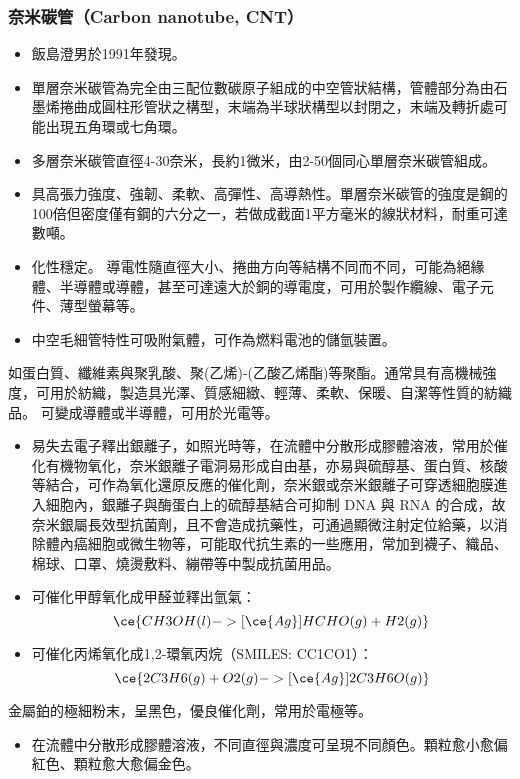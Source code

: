 \documentclass[a4paper,12pt]{report}
\begin{document}
\begin{itemize}
\begin{itemize}
\begin{itemize}
\subsubsection{奈米碳管（Carbon nanotube, CNT）}
\begin{itemize}
\item 飯島澄男於1991年發現。
\item 單層奈米碳管為完全由三配位數碳原子組成的中空管狀結構，管體部分為由石墨烯捲曲成圓柱形管狀之構型，末端為半球狀構型以封閉之，末端及轉折處可能出現五角環或七角環。
\item 多層奈米碳管直徑4-30奈米，長約1微米，由2-50個同心單層奈米碳管組成。
\item 具高張力強度、強韌、柔軟、高彈性、高導熱性。單層奈米碳管的強度是鋼的100倍但密度僅有鋼的六分之一，若做成截面1平方毫米的線狀材料，耐重可達數噸。
\item 化性穩定。
導電性隨直徑大小、捲曲方向等結構不同而不同，可能為絕緣體、半導體或導體，甚至可達遠大於銅的導電度，可用於製作纜線、電子元件、薄型螢幕等。
\item 中空毛細管特性可吸附氣體，可作為燃料電池的儲氫裝置。
\end{itemize}
如蛋白質、纖維素與聚乳酸、聚(乙烯)-(乙酸乙烯酯)等聚酯。通常具有高機械強度，可用於紡織，製造具光澤、質感細緻、輕薄、柔軟、保暖、自潔等性質的紡織品。
可變成導體或半導體，可用於光電等。
\begin{itemize}
\item 易失去電子釋出銀離子，如照光時等，在流體中分散形成膠體溶液，常用於催化有機物氧化，奈米銀離子電洞易形成自由基，亦易與硫醇基、蛋白質、核酸等結合，可作為氧化還原反應的催化劑，奈米銀或奈米銀離子可穿透細胞膜進入細胞內，銀離子與酶蛋白上的硫醇基結合可抑制 DNA 與 RNA 的合成，故奈米銀屬長效型抗菌劑，且不會造成抗藥性，可通過顯微注射定位給藥，以消除體內癌細胞或微生物等，可能取代抗生素的一些應用，常加到襪子、織品、棉球、口罩、燒燙敷料、繃帶等中製成抗菌用品。
\item 可催化甲醇氧化成甲醛並釋出氫氣：
\[\ce{CH3OH(l) ->[\ce{Ag}] HCHO(g) + H2(g)}\]
\item 可催化丙烯氧化成1,2-環氧丙烷（SMILES: CC1CO1）：
\[\ce{2C3H6(g) + O2(g) ->[\ce{Ag}] 2C3H6O(g)}\]
\end{itemize}
金屬鉑的極細粉末，呈黑色，優良催化劑，常用於電極等。
\begin{itemize}
\item 在流體中分散形成膠體溶液，不同直徑與濃度可呈現不同顏色。顆粒愈小愈偏紅色、顆粒愈大愈偏金色。

\end{itemize}
\end{itemize}
\end{itemize}
\end{itemize}
\end{document}
